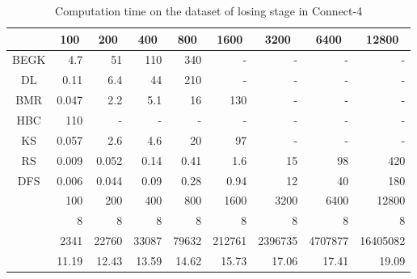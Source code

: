 \begin{table}
\caption{Computation time on the dataset of losing stage in Connect-4}
\label{losing}
\begin{center}
\begin{tabular}[c]{| r | r | r | r | r | r | r | r | r |}
\hline
\multicolumn{1}{|c||}{} & \multicolumn{1}{|c|}{100} & \multicolumn{1}{|c|}{200} & \multicolumn{1}{|c|}{400} & \multicolumn{1}{|c|}{800} & \multicolumn{1}{|c|}{1600} & \multicolumn{1}{|c|}{3200} & \multicolumn{1}{|c|}{6400} & \multicolumn{1}{|c|}{12800} \\\hline
\multicolumn{1}{|c||}{BEGK} &4.7&51&110&340&-&-&-&- \\\hline
\multicolumn{1}{|c||}{DL} &0.11&6.4&44&210&-&-&-&- \\\hline
\multicolumn{1}{|c||}{BMR} &0.047&2.2&5.1&16&130&-&-&- \\\hline
\multicolumn{1}{|c||}{HBC} &110&-&-&-&-&-&-&- \\\hline
\multicolumn{1}{|c||}{KS} &0.057&2.6&4.6&20&97&-&-&- \\\hline
\multicolumn{1}{|c||}{RS} &0.009 & 0.052 & 0.14 & 0.41 & 1.6 & 15 & 98 & 420\\\hline
\multicolumn{1}{|c||}{DFS} &0.006 & 0.044 & 0.09 & 0.28 & 0.94 & 12 & 40 & 180\\\hline
\hline
\multicolumn{1}{|c||}{} & 100 & 200 & 400 & 800 & 1600 & 3200 & 6400 & 12800\\\hline 
\multicolumn{1}{|c||}{} & 8 & 8 & 8 & 8 & 8 & 8 & 8 & 8\\\hline 
\multicolumn{1}{|c||}{} & 2341 & 22760 & 33087 & 79632 & 212761 & 2396735 & 4707877 & 16405082\\\hline 
\multicolumn{1}{|c||}{} & 11.19 & 12.43 & 13.59 & 14.62 & 15.73 & 17.06 & 17.41 & 19.09\\\hline
\end{tabular}
\end{center}
\end{table}


